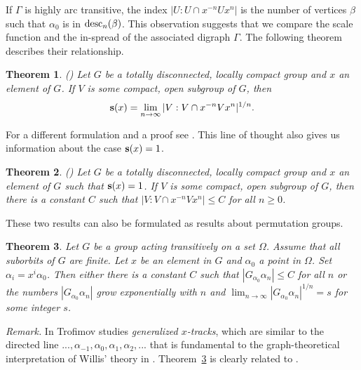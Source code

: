 \documentclass{emsprocart}
\newtheorem{theorem}{Theorem}[section]
\theoremstyle{definition}
\begin{document}
\bigskip

If $\Gamma$ is highly arc transitive, the index $|U:U\cap x^{-n}Ux^{n}|$
is the number of vertices $\beta$ such that
$\alpha_0$ is in ${\mbox{${\rm desc}$}}_n(\beta)$. This observation suggests that we compare
the scale function and the in-spread of the associated digraph $\Gamma$. The following
theorem describes their relationship.

\begin{theorem} {\rm (\cite[Theorem~7.7]{Moller2002})}
Let $G$ be a totally disconnected, locally compact group and $x$ an
element of $G$.  If $V$ is some compact, open subgroup of $G$, then
$${\mbox{\bf s}}(x)=\lim_{n\rightarrow\infty}|V:V\cap x^{-n}Vx^n|^{1/n}.$$
\end{theorem}

For a different formulation and a proof see
\cite[Lemma~4]{BaumgartnerWillis2006}.
This line of thought also gives us information about the case
${\mbox{\bf s}}(x)=1$.

\begin{theorem}
{\rm (\cite[Corollary~7.8]{Moller2002})}
Let $G$ be a totally disconnected, locally compact group and $x$ an
element of $G$ such that ${\mbox{\bf s}}(x)=1$.
If $V$ is some compact, open subgroup of $G$, then there is a constant
$C$ such that
$|V:V\cap x^{-n}Vx^n|\leq C$ for all $n\geq 0$.
\end{theorem}

These two results can also be formulated as results about
permutation groups.

\begin{theorem}\label{TExponential}
Let $G$ be a group acting transitively on a set $\Omega$.  Assume that
all sub\-orbits of $G$ are finite.  Let $x$ be an element in $G$ and
$\alpha_0$ a point in $\Omega$.  Set $\alpha_i=x^i\alpha_0$.  Then
either there is a constant $C$ such that $|G_{\alpha_0}\alpha_n|\leq
C$ for all $n$ or the numbers $|G_{\alpha_0}\alpha_n|$ grow
exponentially with $n$ and
$\lim_{n\rightarrow\infty}|G_{\alpha_0}\alpha_n|^{1/n}=s$
for some integer $s$.
\end{theorem}

{\em Remark.}  
In
\cite{Trofimov2007}  Trofimov studies {\em
  generalized $x$-tracks}, which
are similar to  the directed line $...,
\alpha_{-1}, \alpha_0, \alpha_1, \alpha_2, ...$ that is fundamental to
the graph-theoretical interpretation of Willis' theory in
\cite{Moller2002}.  Theorem~\ref{TExponential} is 
clearly related to \cite[Theorem~4.1, part 3]{Trofimov2007}.
\end{document}
